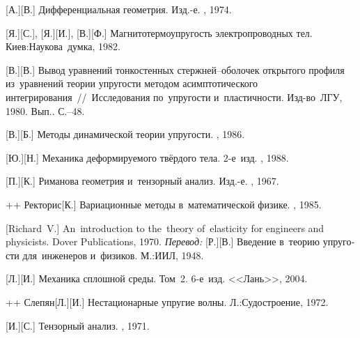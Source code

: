 \begin{thebibliography}{123}
\begin{otherlanguage}{russian}
[А.][В.] Дифференциальная геометрия. Изд.\hbox{-}е. \naukapublisher, 1974. 

[Я.][С.], [Я.][И.], [В.][Ф.] Магнито\-термо\-упру\-гость электропроводных тел. Киев:\;Наукова~думка, 1982. 

[В.][В.] Вывод уравнений тонко\-стен\-ных стержней\hbox{--}обо\-ло\-чек открытого профиля из~уравнений теории упругости методом асимптотического интегрирования~//~Исследования по~упругости и~пластичности. Изд\hbox{-}во~ЛГУ, 1980. Вып.. С.\hbox{--}48.

[В.][Б.] Методы динамической теории упругости. \naukapublisher, 1986. 

[Ю.][Н.] Механика деформируемого твёрдого тела. 2\hbox{-}е~изд. \naukapublisher, 1988. 

[П.][К.] Риманова геометрия и~тензорный анализ. Изд.\hbox{-}е. \naukapublisher, 1967. 

++ {Ректорис}[К.] Вариационные методы в~математической физике. \mirpublisher, 1985. 

[Richard~V.] An~introduction to the~theory of~elasticity for engineers and physicists. Dover Publications, 1970. 
\emph{Перевод:} [Р.][В.] Введение в~теорию упругости для~инженеров и~физиков. М.:\;ИИЛ, 1948. 

[Л.][И.] Механика сплошной среды. Том~2. 6\hbox{-}е~изд. <<Лань>>, 2004. 

++ {Слепян}[Л.][И.] Нестационарные упругие волны. Л.:\;Судостроение, 1972. 

[И.][С.] Тензорный анализ. \naukapublisher, 1971. 


\end{otherlanguage}
\end{thebibliography}
